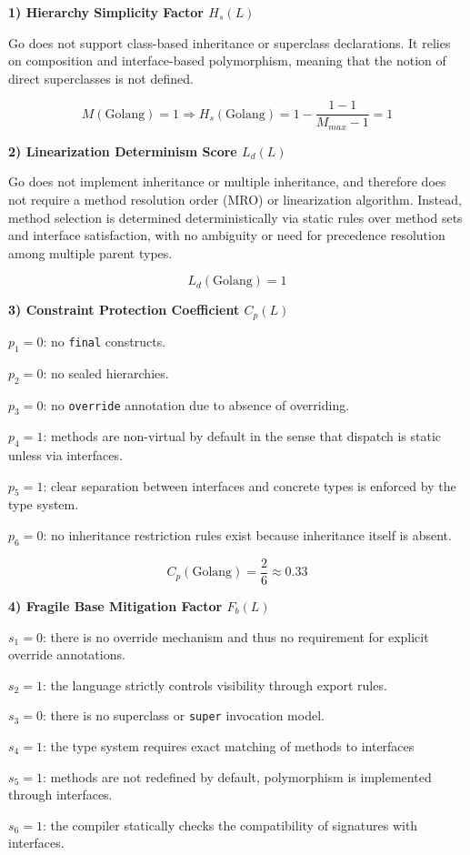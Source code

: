 \textbf{1) Hierarchy Simplicity Factor $H_s(L)$}

Go does not support class-based inheritance or superclass declarations. It relies on composition and interface-based polymorphism, meaning that the notion of direct superclasses is not defined. 

\[
    M(\text{Golang}) = 1 \Rightarrow H_s(\text{Golang}) = 1 - \frac{1-1}{M_{max}-1}=1
\]

\textbf{2) Linearization Determinism Score $L_d(L)$}

Go does not implement inheritance or multiple inheritance, and therefore does not require a method resolution order (MRO) or linearization algorithm. Instead, method selection is determined deterministically via static rules over method sets and interface satisfaction, with no ambiguity or need for precedence resolution among multiple parent types. 

\[
    L_d(\text{Golang})=1
\]

\textbf{3) Constraint Protection Coefficient $C_p(L)$}

$p_1=0$: no \texttt{final} constructs.

$p_2=0$: no sealed hierarchies.

$p_3=0$: no \texttt{override} annotation due to absence of overriding.

$p_4=1$: methods are non-virtual by default in the sense that dispatch is static unless via interfaces.

$p_5=1$: clear separation between interfaces and concrete types is enforced by the type system.

$p_6=0$: no inheritance restriction rules exist because inheritance itself is absent.

\[
    C_p(\text{Golang})=\frac{2}{6}\approx0.33
\]


\textbf{4) Fragile Base Mitigation Factor $F_b(L)$}

$s_1=0$: there is no override mechanism and thus no requirement for explicit override annotations. 

$s_2=1$: the language strictly controls visibility through export rules.

$s_3=0$: there is no superclass or \texttt{super} invocation model.

$s_4=1$: the type system requires exact matching of methods to interfaces

$s_5=1$: methods are not redefined by default, polymorphism is implemented through interfaces.

$s_6=1$: the compiler statically checks the compatibility of signatures with interfaces.


